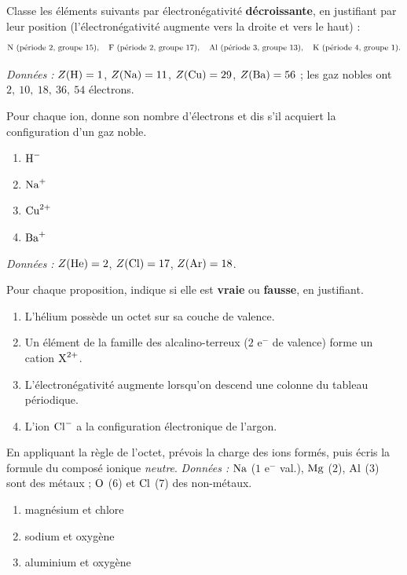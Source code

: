 \documentclass[11pt,a4paper]{article}
\begin{document}
\begin{exo}
Classe les éléments suivants par électronégativité \textbf{décroissante}, en justifiant par leur
position (l'électronégativité augmente vers la droite et vers le haut) :
\[ \ce{N}\ (\text{période 2, groupe 15}),\quad \ce{F}\ (\text{période 2, groupe 17}),\quad
   \ce{Al}\ (\text{période 3, groupe 13}),\quad \ce{K}\ (\text{période 4, groupe 1}). \]
\end{exo}

\begin{exo}
\textit{Données :} $Z(\ce{H})=1$, $Z(\ce{Na})=11$, $Z(\ce{Cu})=29$, $Z(\ce{Ba})=56$ ; les gaz nobles
ont $2,\ 10,\ 18,\ 36,\ 54$ électrons.

\smallskip
Pour chaque ion, donne son nombre d'électrons et dis s'il acquiert la configuration d'un gaz noble.
\begin{enumerate}[label=\alph*)]
  \item $\ce{H^{-}}$
  \item $\ce{Na^{+}}$
  \item $\ce{Cu^{2+}}$
  \item $\ce{Ba^{+}}$
\end{enumerate}
\end{exo}

\begin{exo}
\textit{Données :} $Z(\ce{He})=2$, $Z(\ce{Cl})=17$, $Z(\ce{Ar})=18$.

\smallskip
Pour chaque proposition, indique si elle est \textbf{vraie} ou \textbf{fausse}, en justifiant.
\begin{enumerate}[label=\alph*)]
  \item L'hélium possède un octet sur sa couche de valence.
  \item Un élément de la famille des alcalino-terreux ($2$ e$^-$ de valence) forme un cation $\ce{X^{2+}}$.
  \item L'électronégativité augmente lorsqu'on descend une colonne du tableau périodique.
  \item L'ion $\ce{Cl^{-}}$ a la configuration électronique de l'argon.
\end{enumerate}
\end{exo}

\begin{exo}
En appliquant la règle de l'octet, prévois la charge des ions formés, puis écris la formule du composé
ionique \emph{neutre}. \textit{Données :} $\ce{Na}$ ($1$ e$^-$ val.), $\ce{Mg}$ ($2$), $\ce{Al}$ ($3$)
sont des métaux ; $\ce{O}$ ($6$) et $\ce{Cl}$ ($7$) des non-métaux.
\begin{enumerate}[label=\alph*)]
  \item magnésium et chlore
  \item sodium et oxygène
  \item aluminium et oxygène
\end{enumerate}
\end{exo}
\end{document}
